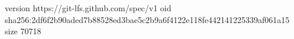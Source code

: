 version https://git-lfs.github.com/spec/v1
oid sha256:2df6f2b90aded7b88528ed3bae5c2b9a6f4122e118fe442141225339af061a15
size 70718
